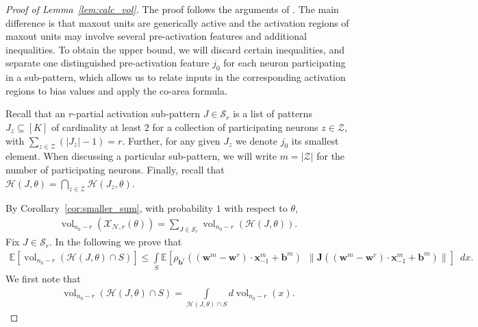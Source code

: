 \documentclass{article}
\theoremstyle{definition}
\newcommand{\net}{\mathcal{N}}
\newcommand{\nin}{n_0}
\newcommand{\vol}{\operatorname{vol}}
\begin{document}
\begin{proof}[Proof of Lemma~\ref{lem:calc_vol}]
The proof follows the arguments of \citet[Theorem~6]{pmlr-v97-hanin19a}. 
The main difference is that maxout units are generically active and the activation regions of maxout units may involve several pre-activation features and additional inequalities.
To obtain the upper bound, we will discard certain inequalities, and separate one distinguished pre-activation feature $j_0$ for each neuron participating in a sub-pattern, which allows us to relate inputs in the corresponding activation regions to bias values and apply the co-area formula. 

    Recall that an $r$-partial activation sub-pattern ${J} \in\mathcal{S}_r$ is a list of patterns $J_z\subseteq[K]$ of cardinality at least $2$ for a collection of participating neurons $z \in \mathcal{Z}$, with $\sum_{z\in \mathcal{Z}}(|J_z|-1) = r$. 
    Further, for any given $J_z$ we denote $j_0$ its smallest element. 
    When discussing a particular sub-pattern, we will write $m = |\mathcal{Z}|$ for the number of participating neurons.
    Finally, recall that $\mathcal{H}({J}, \theta) = \bigcap_{z \in \mathcal{Z}} \mathcal{H} (J_z,\theta)$. 

    By Corollary~\ref{cor:smaller_sum}, with probability $1$ with respect to $\theta$, 
    \begin{align*}
        \vol_{\nin - r}(\mathcal{X}_{\net, r}(\theta)) = \sum_{{J} \in \mathcal{S}_r} \vol_{\nin - r} (\mathcal{H} (J, \theta)).
    \end{align*}
Fix $J\in\mathcal{S}_r$. In the following we prove that 
    \begin{align*}
    \mathbb{E}[\vol_{\nin - r} (\mathcal{H}(J,\theta) \cap S)]\leq \int\limits_{S} \mathbb{E} \left[ \rho_{\mathbf{b}^r}((\mathbf{w}^m - \mathbf{w}^r) \cdot \mathbf{x}^m_{-1} + \mathbf{b}^m) \enspace \| \mathbf{J} ((\mathbf{w}^m - \mathbf{w}^r) \cdot \mathbf{x}^m_{-1} + \mathbf{b}^m)\| \right] \enspace d x.
    \end{align*}
    We first note that 
    \begin{align}
        \vol_{\nin - r}(\mathcal{H}(J,\theta) \cap S) = \int\limits_{\mathcal{H}(J,\theta) \cap S } d\vol_{\nin - r}(x).
        \label{eq:vol_general}
    \end{align}


\end{proof}
\end{document}
